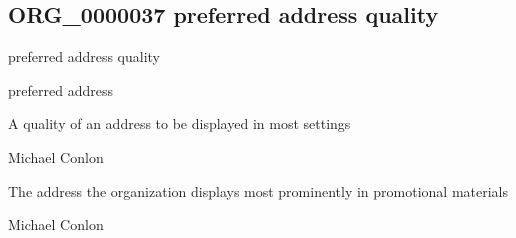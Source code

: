 \documentclass[letterpaper,10pt,english]{sphinxmanual}
\begin{document}
\subsection{ORG\_0000037 \sphinxhyphen{} preferred address quality}
\label{\detokenize{doc-ORG_0000037:org-0000037-preferred-address-quality}}\label{\detokenize{doc-ORG_0000037:index-0}}\label{\detokenize{doc-ORG_0000037::doc}}
\begin{sphinxShadowBox}

\sphinxAtStartPar
preferred address quality
\end{sphinxShadowBox}

\begin{sphinxShadowBox}

\sphinxAtStartPar
preferred address
\end{sphinxShadowBox}

\begin{sphinxShadowBox}

\sphinxAtStartPar
{\hyperref[\detokenize{doc-BFO_0000019::doc}]{}}
\end{sphinxShadowBox}

\begin{sphinxShadowBox}

\sphinxAtStartPar
A quality of an address to be displayed in most settings
\end{sphinxShadowBox}

\begin{sphinxShadowBox}

\sphinxAtStartPar
Michael Conlon 
\end{sphinxShadowBox}

\begin{sphinxShadowBox}

\sphinxAtStartPar
The address the organization displays most prominently in promotional materials
\end{sphinxShadowBox}

\begin{sphinxShadowBox}

\sphinxAtStartPar
Michael Conlon 
\end{sphinxShadowBox}
\begin{quote}

\ignorespaces \end{quote}
\end{document}
